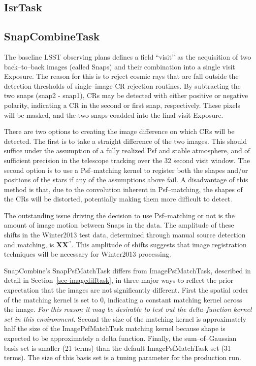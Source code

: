 \documentclass[12pt]{article}
\def\arcsec{^{\prime\prime}}
\begin{document}
\subsection{IsrTask}

\subsection{SnapCombineTask}

The baseline LSST observing plans defines a field ``visit'' as the
acquisition of two back--to--back images (called Snaps) and their
combination into a single visit Exposure.  The reason for this is to
reject cosmic rays that are fall outside the detection thresholds of
single--image CR rejection routines.  By subtracting the two snaps
(snap2 - snap1), CRs may be detected with either positive or negative
polarity, indicating a CR in the second or first snap, respectively.
These pixels will be masked, and the two snaps coadded into the final
visit Exposure.

There are two options to creating the image difference on which CRs
will be detected.  The first is to take a straight difference of the
two images.  This should suffice under the assumption of a fully
realized Psf and stable atmosphere, and of sufficient precision in the
telescope tracking over the 32 second visit window.  The second option
is to use a Psf--matching kernel to register both the shapes and/or
positions of the stars if any of the assumptions above fail.  A
disadvantage of this method is that, due to the convolution inherent
in Psf--matching, the shapes of the CRs will be distorted, potentially
making them more difficult to detect.

The outstanding issue driving the decision to use Psf--matching or not
is the amount of image motion between Snaps in the data.  The
amplitude of these shifts in the Winter2013 test data, determined
through manual source detection and matching, is {\bf XX}$\arcsec$.
This amplitude of shifts suggests that image registration techniques
will be necessary for Winter2013 processing. 

SnapCombine's SnapPsfMatchTask differs from ImagePsfMatchTask,
described in detail in Section~\ref{sec-imagedifftask}, in three major
ways to reflect the prior expectation that the images are not
significantly different.  First the spatial order of the matching
kernel is set to 0, indicating a constant matching kernel across the
image.  {\it For this reason it may be desirable to test out the
  delta--function kernel set in this environment}.  Second the size of
the matching kernel is approximately half the size of the
ImagePsfMatchTask matching kernel because shape is expected to be
approximately a delta function.  Finally, the sum--of--Gaussian basis
set is smaller (21 terms) than the default ImagePsfMatchTask set (31
terms).  The size of this basis set is a tuning parameter for the
production run.
\end{document}
